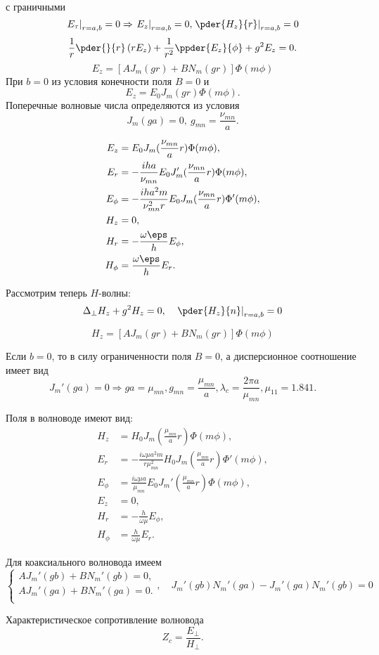 с граничными
\[
	\left.E_\tau\right|_{r=a,b} = 0 \Rightarrow \left.E_z\right|_{r=a,b} = 0, \left.\pder{H_z}{r}\right|_{r=a,b} = 0
\]
\[
	\frac{1}{r}\pder{}{r}\left( rE_z \right) + \frac{1}{r^2}\ppder{E_z}{\phi} + g^2E_z = 0.
\]
\[
	E_z = [AJ_m(gr) + BN_m(gr)]\Phi(m\phi)
\]
При \( b = 0 \) из условия конечности поля \( B = 0 \) и
\[
	E_z = E_0J_m(gr)\Phi(m\phi).
\]
Поперечные волновые числа определяются из условия
\[
	J_m(ga) = 0,\ g_{mn} = \frac{\nu_{mn}}{a}.
\]

\begin{align*}
	E_z &= E_0 J_m(\frac{\nu_{mn}}{a}r)\Phi(m\phi),\\
	E_r &= -\frac{iha}{\nu_{mn}}E_0 J_m'(\frac{\nu_{mn}}{a}r)\Phi(m\phi),\\
	E_\phi &= -\frac{iha^2m}{\nu_{mn}^2r}E_0 J_m(\frac{\nu_{mn}}{a}r)\Phi'(m\phi),\\
	H_z &= 0,\\
	H_r &= -\frac{\omega\eps}{h}E_\phi,\\
	H_\phi &= \frac{\omega\eps}{h}E_r.
\end{align*}


Рассмотрим теперь \( H \)-волны:
\[
	\Delta_\perp H_z + g^2H_z = 0,\quad \left.\pder{H_z}{n}\right|_{r=a,b}= 0
\]

\[
	H_z = [AJ_m(gr) + BN_m(gr)]\Phi(m\phi)
\]

Если \( b=0 \), то в силу ограниченности поля \(B = 0\), а дисперсионное соотношение имеет вид
\[
	J_m'(ga) = 0 \Rightarrow ga = \mu_{mn}, g_{mn} = \frac{\mu_{mn}}{a}, \lambda_c = \frac{2\pi a}{\mu_{mn}}, \mu_{11} = 1.841.
\]

Поля в волноводе имеют вид:
\begin{align*}
	H_z &= H_0 J_m(\frac{\mu_{mn}}{a}r)\Phi(m\phi),\\
	E_r &= -\frac{i\omega\mu a^2m}{r\mu_{mn}^2}H_0 J_m(\frac{\mu_{mn}}{a}r)\Phi'(m\phi),\\
	E_\phi &= \frac{i\omega\mu a}{\mu_{mn}}E_0 J_m'(\frac{\mu_{mn}}{a}r)\Phi(m\phi),\\
	E_z &= 0,\\
	H_r &= -\frac{h}{\omega\mu}E_\phi,\\
	H_\phi &= \frac{h}{\omega\mu}E_r.
\end{align*}

Для коаксиального волновода имеем
\[
	\begin{cases}
		AJ_m'(gb) + BN_m'(gb) = 0,\\
		AJ_m'(ga) + BN_m'(ga) = 0.\\
	\end{cases},
	\quad
	J_m'(gb)N_m'(ga) - J_m'(ga)N_m'(gb) = 0
\]

Характеристическое сопротивление волновода
\[
	Z_c = \frac{E_\perp}{H_\perp}.
\]
